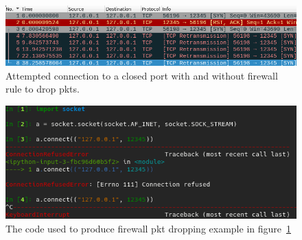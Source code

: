 \documentclass[titlepage]{article}
\begin{document}
\begin{figure}[H]
  \centering
  \includegraphics[width=\textwidth]{screenshots/packet_drop.png}
  \caption{%
    Attempted connection to a closed port with and without firewall rule to drop \glspl{pkt}.
  }\label{firewall}
\end{figure}

\begin{figure}[H]
  \centering
  \includegraphics[width=\textwidth]{screenshots/packet_drop_code.png}
  \caption{%
    The code used to produce firewall \gls{pkt} dropping example in figure~\ref{firewall}
  }\label{firewall_code}
\end{figure}
\end{document}
